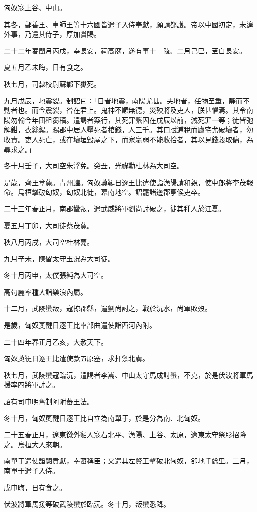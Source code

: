 \begin{pinyinscope}
匈奴寇上谷、中山。

其冬，鄯善王、車師王等十六國皆遣子入侍奉獻，願請都護。帝以中國初定，未遑外事，乃還其侍子，厚加賞賜。

二十二年春閏月丙戌，幸長安，祠高廟，遂有事十一陵。二月己巳，至自長安。

夏五月乙未晦，日有食之。

秋七月，司隸校尉蘇鄴下獄死。

九月戊辰，地震裂。制詔曰：「日者地震，南陽尤甚。夫地者，任物至重，靜而不動者也。而今震裂，咎在君上。鬼神不順無德，災殃將及吏人，朕甚懼焉。其令南陽勿輸今年田租芻稿。遣謁者案行，其死罪繫囚在戊辰以前，減死罪一等；徒皆弛解鉗，衣絲絮。賜郡中居人壓死者棺錢，人三千。其口賦逋稅而廬宅尤破壞者，勿收責。吏人死亡，或在壞垣毀屋之下，而家羸弱不能收拾者，其以見錢穀取傭，為尋求之。」

冬十月壬子，大司空朱浮免。癸丑，光祿勳杜林為大司空。

是歲，齊王章薨。青州蝗。匈奴薁鞬日逐王比遣使詣漁陽請和親，使中郎將李茂報命。烏桓擊破匈奴，匈奴北徙，幕南地空。詔罷諸邊郡亭候吏卒。

二十三年春正月，南郡蠻叛，遣武威將軍劉尚討破之，徙其種人於江夏。

夏五月丁卯，大司徒蔡茂薨。

秋八月丙戌，大司空杜林薨。

九月辛未，陳留太守玉況為大司徒。

冬十月丙申，太僕張純為大司空。

高句麗率種人詣樂浪內屬。

十二月，武陵蠻叛，寇掠郡縣，遣劉尚討之，戰於沅水，尚軍敗歿。

是歲，匈奴薁鞬日逐王比率部曲遣使詣西河內附。

二十四年春正月乙亥，大赦天下。

匈奴薁鞬日逐王比遣使款五原塞，求扞禦北虜。

秋七月，武陵蠻寇臨沅，遣謁者李嵩、中山太守馬成討蠻，不克，於是伏波將軍馬援率四將軍討之。

詔有司申明舊制阿附蕃王法。

冬十月，匈奴薁鞬日逐王比自立為南單于，於是分為南、北匈奴。

二十五春正月，遼東徼外貊人寇右北平、漁陽、上谷、太原，遼東太守祭肜招降之。烏桓大人來朝。

南單于遣使詣闕貢獻，奉蕃稱臣；又遣其左賢王擊破北匈奴，卻地千餘里。三月，南單于遣子入侍。

戊申晦，日有食之。

伏波將軍馬援等破武陵蠻於臨沅。冬十月，叛蠻悉降。


\end{pinyinscope}

